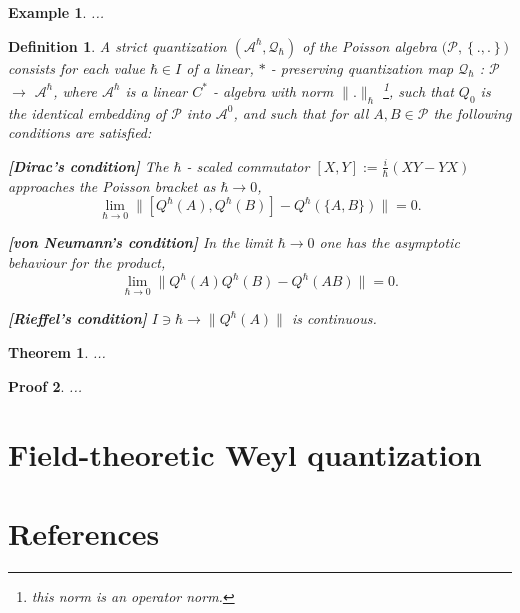 \documentclass[10pt]{article} %
\numberwithin{equation}{section}
\numberwithin{equation}{section} %
\numberwithin{figure}{section} %
\newcommand{\norm}[1]{\|{#1}\|} %
\newcommand{\PB}[2]{\left\{{#1},{#2}\right\}} %
\theoremstyle{theoremsf}
\newtheorem{thm}{Theorem}[section]
\newtheorem{demo}[thm]{Proof}
\theoremstyle{definitionsf}
\newtheorem{dfn}{Definition}[section]
\newtheorem{ex}{Example}[section]
\begin{document}
\begin{ex}
 ...
\end{ex}


\begin{dfn}
 A strict quantization $(\mathcal{A}^\hbar , \mathcal{Q}_\hbar)$ of the Poisson algebra $\big(\mathcal{P},\PB{.}{.}\big)$ consists for each value $\hbar \in I$ of a linear, $\ast$ - preserving quantization map $\mathcal{Q}_\hbar$ : $\mathcal{P}$ $\rightarrow$ $\mathcal{A}^\hbar$, where $\mathcal{A}^\hbar$ is a linear $C^\ast$ - algebra with norm $\norm{.}_{\hbar}$ \footnote{this norm is an operator norm.}, such that $Q_{0}$ is the identical embedding of $\mathcal{P}$ into $\mathcal{A}^0$, and such that for all $A, B \in \mathcal{P}$ the following conditions are satisfied:
 \begin{description}
  \item \textbf{[Dirac's condition]} The $\hbar$ - scaled commutator $[X,Y] := \frac{i}{\hbar} (XY -YX)$ approaches the Poisson bracket as $\hbar \to 0$,
  \begin{equation}
   \lim_{\hbar \to 0} \norm{[Q^{\hbar}(A),Q^{\hbar}(B)] - Q^{\hbar}(\{A,B\})} = 0.
  \end{equation}
  \item \textbf{[von Neumann's condition]} In the limit $\hbar \to 0$ one has the asymptotic behaviour for the product,
  \begin{equation}
   \lim_{\hbar \to 0} \norm{Q^{\hbar}(A)Q^{\hbar}(B) - Q^{\hbar}(AB) } = 0.
  \end{equation}
  \item \textbf{[Rieffel's condition]} $I \ni \hbar \to \norm{Q^{\hbar}(A)}$ is continuous.
 \end{description}
\end{dfn}

\begin{thm}
 ...
\end{thm}

\begin{demo}
 ...
\end{demo}

\section{Field-theoretic Weyl quantization}

\noindent
[blablabla]

\section{References}

\renewcommand{\section}[2]{}
 

%
%
%
%
%

%
%
\end{document}
